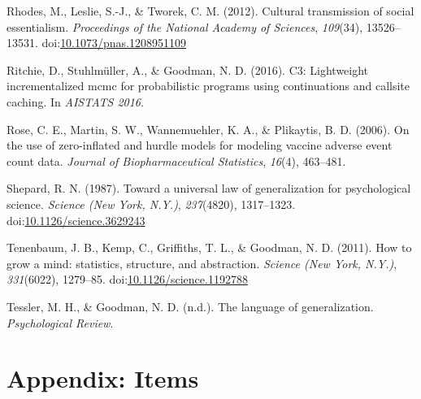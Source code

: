 \documentclass[,man,floatsintext]{apa6}
\theoremstyle{definition}
\theoremstyle{definition}
\theoremstyle{definition}
\theoremstyle{remark}
\begin{document}
\leavevmode\hypertarget{ref-Rhodes2012}{}%
Rhodes, M., Leslie, S.-J., \& Tworek, C. M. (2012). Cultural
transmission of social essentialism. \emph{Proceedings of the National
Academy of Sciences}, \emph{109}(34), 13526--13531.
doi:\href{https://doi.org/10.1073/pnas.1208951109}{10.1073/pnas.1208951109}

\leavevmode\hypertarget{ref-Ritchie2016}{}%
Ritchie, D., Stuhlmüller, A., \& Goodman, N. D. (2016). C3: Lightweight
incrementalized mcmc for probabilistic programs using continuations and
callsite caching. In \emph{AISTATS 2016}.

\leavevmode\hypertarget{ref-hurdleModels}{}%
Rose, C. E., Martin, S. W., Wannemuehler, K. A., \& Plikaytis, B. D.
(2006). On the use of zero-inflated and hurdle models for modeling
vaccine adverse event count data. \emph{Journal of Biopharmaceutical
Statistics}, \emph{16}(4), 463--481.

\leavevmode\hypertarget{ref-Shepard1987}{}%
Shepard, R. N. (1987). Toward a universal law of generalization for
psychological science. \emph{Science (New York, N.Y.)},
\emph{237}(4820), 1317--1323.
doi:\href{https://doi.org/10.1126/science.3629243}{10.1126/science.3629243}

\leavevmode\hypertarget{ref-Tenenbaum2011}{}%
Tenenbaum, J. B., Kemp, C., Griffiths, T. L., \& Goodman, N. D. (2011).
How to grow a mind: statistics, structure, and abstraction.
\emph{Science (New York, N.Y.)}, \emph{331}(6022), 1279--85.
doi:\href{https://doi.org/10.1126/science.1192788}{10.1126/science.1192788}

\leavevmode\hypertarget{ref-TesslerLangGenUnderReview}{}%
Tessler, M. H., \& Goodman, N. D. (n.d.). The language of
generalization. \emph{Psychological Review}.

\newpage

\hypertarget{appendix-items}{%
\section{Appendix: Items}\label{appendix-items}}
\end{document}
